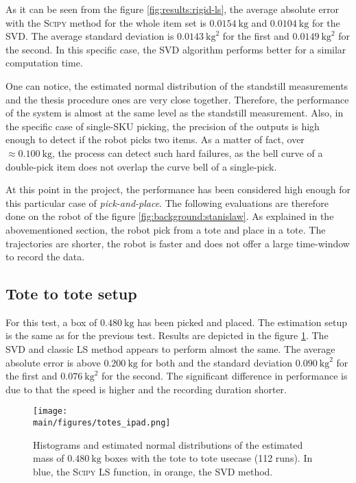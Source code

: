 \documentclass[/home/francois/latex/report/main.tex]{subfiles}
\begin{document}
As it can be seen from the figure \ref{fig:results:rigid-ls}, the average absolute error with the \textsc{Scipy} method for the whole item set is $0.0154 \ \si{\kilogram}$ and $0.0104 \ \si{\kilogram}$ for the \ac{SVD}. The average standard deviation is $0.0143 \ \si{\kilogram\squared}$ for the first and $0.0149 \ \si{\kilogram\squared}$ for the second. In this specific case, the \ac{SVD} algorithm performs better for a similar computation time.

One can notice, the estimated normal distribution of the standstill measurements and the thesis procedure ones are very close together. Therefore, the performance of the system is almost at the same level as the standstill measurement. Also, in the specific case of single-\ac{SKU} picking, the precision of the outputs is high enough to detect if the robot picks two items. As a matter of fact, over $\approx 0.100 \ \si{\kilogram}$, the process can detect such hard failures, as the bell curve of a double-pick item does not overlap the curve bell of a single-pick.

At this point in the project, the performance has been considered high enough for this particular case of \textit{pick-and-place}. The following evaluations are therefore done on the robot of the figure \ref{fig:background:stanislaw}. As explained in the abovementioned section, the robot pick from a tote and place in a tote. The trajectories are shorter, the robot is faster and does not offer a large time-window to record the data.

\subsection{Tote to tote setup}
\label{results:tote}


For this test, a box of $0.480 \ \si{\kilogram}$ has been picked and placed. The estimation setup is the same as for the previous test. Results are depicted in the figure \ref{fig:results:rigid-ls-tote}. The \ac{SVD} and classic \ac{LS} method appears to perform almost the same. The average absolute error is above $0.200 \ \si{\kilogram}$ for both and the standard deviation $0.090 \ \si{\kilogram\squared}$ for the first and $0.076 \ \si{\kilogram\squared}$ for the second. The significant difference in performance is due to that the speed is higher and the recording duration shorter.

\begin{figure}[h]
  \centering
  \texttt{[image: \\main/figures/totes\_ipad.png]}
  \caption{Histograms and estimated normal distributions of the estimated mass of $0.480 \ \si{\kilogram}$ boxes with the tote to tote usecase (112 runs). In blue, the \textsc{Scipy} \ac{LS} function, in orange, the \ac{SVD} method.}
  \label{fig:results:rigid-ls-tote}
\end{figure}
\end{document}
